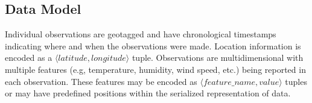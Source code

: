 \subsection{Data Model}
Individual observations are geotagged and have chronological timestamps indicating where and when the observations were made. Location information is encoded as a $\langle latitude, longitude \rangle$ tuple. Observations are multidimensional with multiple features (e.g, temperature, humidity, wind speed, etc.) being reported in each observation. These features may be encoded as $\langle feature\_name, value \rangle$ tuples or may have predefined positions within the serialized representation of data. 


